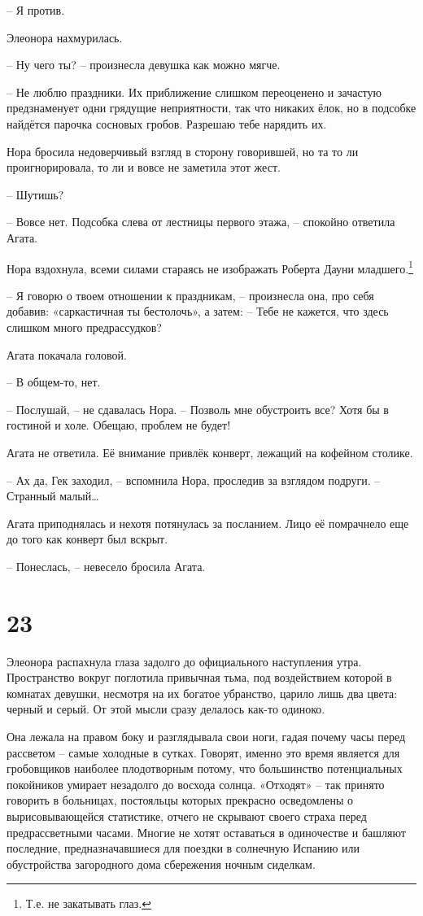 \documentclass[
  a5paperpaper,
  DIV=11,
  numbers=noendperiod]{scrreprt}
\begin{document}
-- Я против.

Элеонора нахмурилась.

-- Ну чего ты? -- произнесла девушка как можно мягче.

-- Не люблю праздники. Их приближение слишком переоценено и зачастую
предзнаменует одни грядущие неприятности, так что никаких ёлок, но в
подсобке найдётся парочка сосновых гробов. Разрешаю тебе нарядить их.

Нора бросила недоверчивый взгляд в сторону говорившей, но та то ли
проигнорировала, то ли и вовсе не заметила этот жест.

-- Шутишь?

-- Вовсе нет. Подсобка слева от лестницы первого этажа, -- спокойно
ответила Агата.

Нора вздохнула, всеми силами стараясь не изображать Роберта Дауни
младшего.\footnote{Т.е. не закатывать глаз.}

-- Я говорю о твоем отношении к праздникам, -- произнесла она, про себя
добавив: «саркастичная ты бестолочь», а затем: -- Тебе не кажется, что
здесь слишком много предрассудков?

Агата покачала головой.

-- В общем-то, нет.

-- Послушай, -- не сдавалась Нора. -- Позволь мне обустроить все? Хотя
бы в гостиной и холе. Обещаю, проблем не будет!

Агата не ответила. Её внимание привлёк конверт, лежащий на кофейном
столике.

-- Ах да, Гек заходил, -- вспомнила Нора, проследив за взглядом подруги.
-- Странный малый\ldots{}

Агата приподнялась и нехотя потянулась за посланием. Лицо её помрачнело
еще до того как конверт был вскрыт.

-- Понеслась, -- невесело бросила Агата.

\section*{23}\label{23}


Элеонора распахнула глаза задолго до официального наступления утра.
Пространство вокруг поглотила привычная тьма, под воздействием которой в
комнатах девушки, несмотря на их богатое убранство, царило лишь два
цвета: черный и серый. От этой мысли сразу делалось как-то одиноко.

Она лежала на правом боку и разглядывала свои ноги, гадая почему часы
перед рассветом -- самые холодные в сутках. Говорят, именно это время
является для гробовщиков наиболее плодотворным потому, что большинство
потенциальных покойников умирает незадолго до восхода солнца. «Отходят»
-- так принято говорить в больницах, постояльцы которых прекрасно
осведомлены о вырисовывающейся статистике, отчего не скрывают своего
страха перед предрассветными часами. Многие не хотят оставаться в
одиночестве и башляют последние, предназначавшиеся для поездки в
солнечную Испанию или обустройства загородного дома сбережения ночным
сиделкам.
\end{document}
